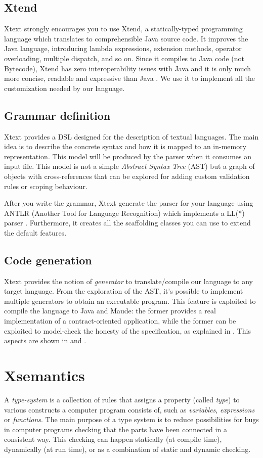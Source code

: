 \subsection{Xtend}
Xtext strongly encourages you to use Xtend, a statically-typed programming language which translates to comprehensible Java source code. It improves the Java language, \ie introducing lambda expressions, extension methods, operator overloading, multiple dispatch, and so on. Since it compiles to Java code (not Bytecode), Xtend has zero interoperability issues with Java and it is only much more concise, readable and expressive than Java \cite{xtend-site}. We use it to implement all the customization needed by our language.

\subsection{Grammar definition}
Xtext provides a DSL designed for the description of textual languages. The main idea is to describe the concrete syntax and how it is mapped to an in-memory representation. This model will be produced by the parser when it consumes an input file. This model is not a simple \textit{Abstract Syntax Tree} (AST) but a graph of objects with cross-references that can be explored for adding custom validation rules or scoping behaviour.

After you write the grammar, Xtext generate the parser for your language using ANTLR (Another Tool for Language Recognition) which implements a LL(*) parser \cite{antlr-site}. Furthermore, it creates all the scaffolding classes you can use to extend the default features.

\subsection{Code generation}
Xtext provides the notion of \textit{generator} to translate/compile our language to any target language.
From the exploration of the AST, it's possible to implement multiple generators to obtain an executable program. This feature is exploited to compile the \coco language to Java and Maude\cite{Maude01}: the former provides a real implementation of a contract-oriented application, while the former can be exploited to model-check the honesty of the \coco specification, as explained in . This aspects are shown in  and .

\section{Xsemantics}\label{sec:xsematics}
A \emph{type-system} is a collection of rules that assigns a property (called \emph{type}) to various constructs a computer program consists of, such as \emph{variables}, \emph{expressions} or \emph{functions}. The main purpose of a type system is to reduce possibilities for bugs in computer programs checking that the parts have been connected in a consistent way. This checking can happen statically (at compile time), dynamically (at run time), or as a combination of static and dynamic checking.

